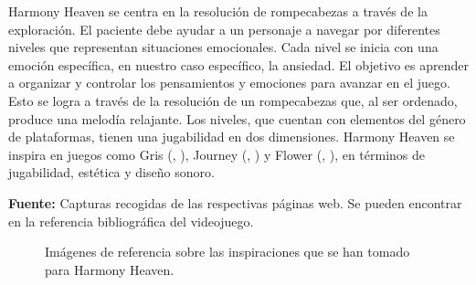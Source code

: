 Harmony Heaven se centra en la resolución de rompecabezas a través de la exploración. El paciente debe ayudar a un personaje a navegar por diferentes niveles que representan situaciones emocionales. Cada nivel se inicia con una emoción específica, en nuestro caso específico, la ansiedad. El objetivo es aprender a organizar y controlar los pensamientos y emociones para avanzar en el juego. Esto se logra a través de la resolución de un rompecabezas que, al ser ordenado, produce una melodía relajante. Los niveles, que cuentan con elementos del género de plataformas, tienen una jugabilidad en dos dimensiones. Harmony Heaven se inspira en juegos como Gris (\citeauthor{GRIS:2018}, \citeyear{GRIS:2018}), Journey (\citeauthor{JOURNEY:2012}, \citeyear{JOURNEY:2012}) y Flower (\citeauthor{FLOWER:2009}, \citeyear{FLOWER:2009}), en términos de jugabilidad, estética y diseño sonoro.

\begin{center}
	\textbf{Fuente:} Capturas recogidas de las respectivas páginas web. Se pueden encontrar en la referencia bibliográfica del videojuego.
	\vspace{-18pt}
\end{center}

\begin{figure}[h!]
	\centering
	\hfil
	\hfil
	\caption[Inspiraciones aplicación Harmony Heaven.]{Imágenes de referencia sobre las inspiraciones que se han tomado para Harmony Heaven.}
	\label{fig:HarmonyHeavenRefs}
\end{figure}

